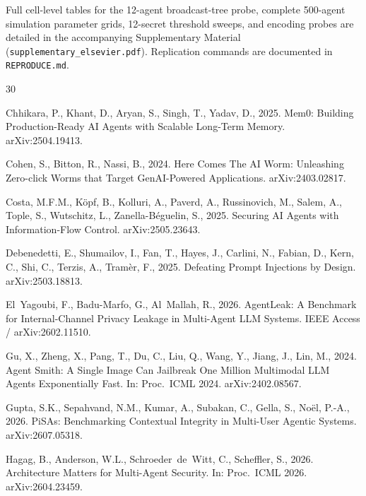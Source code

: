 \documentclass[preprint,12pt,authoryear]{elsarticle}
\begin{document}
Full cell-level tables for the 12-agent broadcast-tree probe, complete 500-agent simulation parameter grids, 12-secret threshold sweeps, and encoding probes are detailed in the accompanying Supplementary Material (\texttt{supplementary\_elsevier.pdf}). Replication commands are documented in \texttt{REPRODUCE.md}.

\begin{thebibliography}{30}
\providecommand{\natexlab}[1]{#1}
\providecommand{\url}[1]{\texttt{#1}}

Chhikara, P., Khant, D., Aryan, S., Singh, T., Yadav, D., 2025. Mem0: Building Production-Ready AI Agents with Scalable Long-Term Memory. arXiv:2504.19413.

Cohen, S., Bitton, R., Nassi, B., 2024. Here Comes The AI Worm: Unleashing Zero-click Worms that Target GenAI-Powered Applications. arXiv:2403.02817.

Costa, M.F.M., K\"opf, B., Kolluri, A., Paverd, A., Russinovich, M., Salem, A., Tople, S., Wutschitz, L., Zanella-B\'eguelin, S., 2025. Securing AI Agents with Information-Flow Control. arXiv:2505.23643.

Debenedetti, E., Shumailov, I., Fan, T., Hayes, J., Carlini, N., Fabian, D., Kern, C., Shi, C., Terzis, A., Tram\`er, F., 2025. Defeating Prompt Injections by Design. arXiv:2503.18813.

El~Yagoubi, F., Badu-Marfo, G., Al~Mallah, R., 2026. AgentLeak: A Benchmark for Internal-Channel Privacy Leakage in Multi-Agent LLM Systems. IEEE Access / arXiv:2602.11510.

Gu, X., Zheng, X., Pang, T., Du, C., Liu, Q., Wang, Y., Jiang, J., Lin, M., 2024. Agent Smith: A Single Image Can Jailbreak One Million Multimodal LLM Agents Exponentially Fast. In: Proc.\ ICML 2024. arXiv:2402.08567.

Gupta, S.K., Sepahvand, N.M., Kumar, A., Subakan, C., Gella, S., No\"el, P.-A., 2026. PiSAs: Benchmarking Contextual Integrity in Multi-User Agentic Systems. arXiv:2607.05318.

Hagag, B., Anderson, W.L., Schroeder~de~Witt, C., Scheffler, S., 2026. Architecture Matters for Multi-Agent Security. In: Proc.\ ICML 2026. arXiv:2604.23459.


\end{thebibliography}
\end{document}
